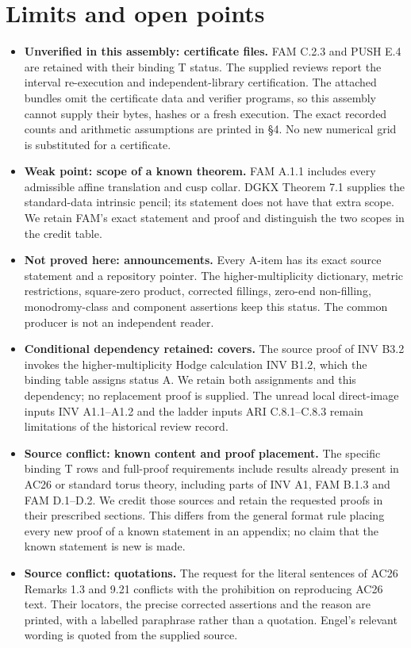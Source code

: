\documentclass[11pt,a4paper]{article}
\theoremstyle{plain}
\theoremstyle{definition}
\begin{document}
\section*{Limits and open points}\label{sec:limits}
\begin{itemize}[leftmargin=*]
\item \textbf{Unverified in this assembly: certificate files.} FAM C.2.3 and PUSH E.4 are retained with their binding T status. The supplied reviews report the interval re-execution and independent-library certification. The attached bundles omit the certificate data and verifier programs, so this assembly cannot supply their bytes, hashes or a fresh execution. The exact recorded counts and arithmetic assumptions are printed in \S4. No new numerical grid is substituted for a certificate.
\item \textbf{Weak point: scope of a known theorem.} FAM A.1.1 includes every admissible affine translation and cusp collar. DGKX Theorem 7.1 supplies the standard-data intrinsic pencil; its statement does not have that extra scope. We retain FAM's exact statement and proof and distinguish the two scopes in the credit table.
\item \textbf{Not proved here: announcements.} Every A-item has its exact source statement and a repository pointer. The higher-multiplicity dictionary, metric restrictions, square-zero product, corrected fillings, zero-end non-filling, monodromy-class and component assertions keep this status. The common producer is not an independent reader.
\item \textbf{Conditional dependency retained: covers.} The source proof of INV B3.2 invokes the higher-multiplicity Hodge calculation INV B1.2, which the binding table assigns status A. We retain both assignments and this dependency; no replacement proof is supplied. The unread local direct-image inputs INV A1.1--A1.2 and the ladder inputs ARI C.8.1--C.8.3 remain limitations of the historical review record.
\item \textbf{Source conflict: known content and proof placement.} The specific binding T rows and full-proof requirements include results already present in AC26 or standard torus theory, including parts of INV A1, FAM B.1.3 and FAM D.1--D.2. We credit those sources and retain the requested proofs in their prescribed sections. This differs from the general format rule placing every new proof of a known statement in an appendix; no claim that the known statement is new is made.
\item \textbf{Source conflict: quotations.} The request for the literal sentences of AC26 Remarks 1.3 and 9.21 conflicts with the prohibition on reproducing AC26 text. Their locators, the precise corrected assertions and the reason are printed, with a labelled paraphrase rather than a quotation. Engel's relevant wording is quoted from the supplied source.

\end{itemize}
\end{document}
